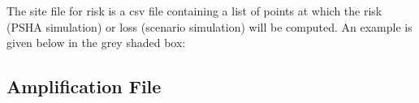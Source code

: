 The site file for risk is a csv file
containing a list of points at which the risk (PSHA simulation)
 or loss (scenario simulation) will be computed. An example is
 given below in the grey shaded box:




\subsection{Amplification File}
\label{sec:-appl-amplification}

